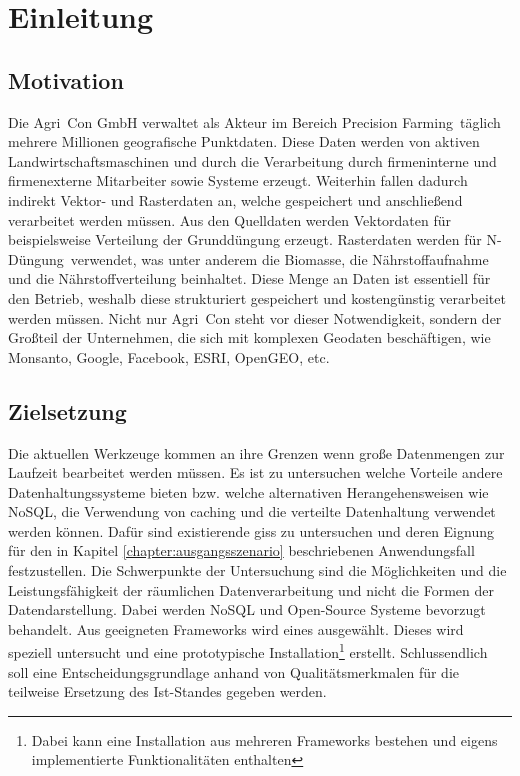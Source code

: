 \chapter{Einleitung}


\section{Motivation}

Die Agri~Con GmbH verwaltet als Akteur im Bereich \glqq Precision Farming\grqq\ täglich mehrere Millionen geografische Punktdaten. Diese Daten werden von aktiven Landwirtschaftsmaschinen und durch die Verarbeitung durch firmeninterne und firmenexterne Mitarbeiter sowie Systeme erzeugt. Weiterhin fallen dadurch indirekt Vektor- und Rasterdaten an, welche gespeichert und anschließend verarbeitet werden müssen.
Aus den Quelldaten werden Vektordaten für beispielsweise Verteilung der Grunddüngung erzeugt. Rasterdaten werden für \glqq N-Düngung\grqq\  verwendet, was unter anderem die Biomasse, die Nährstoffaufnahme und die Nährstoffverteilung beinhaltet.
Diese Menge an Daten ist essentiell für den Betrieb, weshalb diese strukturiert gespeichert und kostengünstig verarbeitet werden müssen. Nicht nur Agri~Con steht vor dieser Notwendigkeit, sondern der Großteil der Unternehmen, die sich mit komplexen Geodaten beschäftigen, wie Monsanto, Google, Facebook, ESRI, OpenGEO, etc.




\section{Zielsetzung}

Die aktuellen Werkzeuge kommen an ihre Grenzen wenn große Datenmengen zur Laufzeit bearbeitet werden müssen. Es ist zu untersuchen welche Vorteile andere Datenhaltungssysteme bieten bzw. welche alternativen Herangehensweisen wie NoSQL, die Verwendung von caching und die verteilte Datenhaltung verwendet werden können.
Dafür sind existierende \Glspl{gis} zu untersuchen und deren Eignung für den in Kapitel \ref{chapter:ausgangsszenario} beschriebenen Anwendungsfall festzustellen. Die Schwerpunkte der Untersuchung sind die Möglichkeiten und die Leistungsfähigkeit der räumlichen Datenverarbeitung und nicht die Formen der Datendarstellung.
Dabei werden NoSQL und Open-Source Systeme bevorzugt behandelt.
Aus geeigneten Frameworks wird eines ausgewählt. Dieses wird speziell untersucht und eine prototypische Installation\footnote{Dabei kann eine Installation aus mehreren Frameworks bestehen und eigens implementierte Funktionalitäten enthalten} erstellt.
Schlussendlich soll eine Entscheidungsgrundlage anhand von Qualitätsmerkmalen für die teilweise Ersetzung des Ist-Standes gegeben werden.

